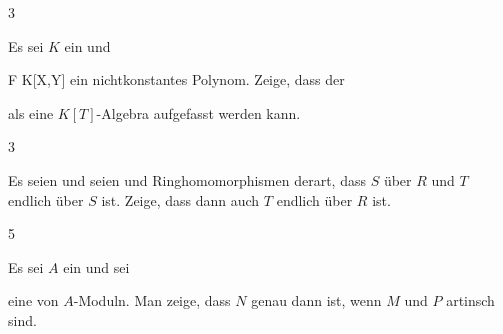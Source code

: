{3}
{





Es sei $K$ ein
und

\mavergleichskette
{\vergleichskette
{ F
}
{ \in }{ K[X,Y]
}
{  }{
}
{    }{
}
{   }{
}
}
{}{}{}
ein nichtkonstantes Polynom. Zeige, dass der

 {  }

als eine
$K[T]$-Algebra aufgefasst werden kann.





}
{} {}

{3}
{





Es seien
und seien
 und
 Ringhomomorphismen derart, dass $S$
über $R$ und $T$ endlich über $S$ ist. Zeige, dass dann auch $T$ endlich über $R$ ist.





}
{} {}

{5}
{





Es sei $A$ ein
und sei

 {  }

eine
von $A$-Moduln. Man zeige, dass $N$ genau dann
ist, wenn $M$ und $P$ artinsch sind.





}
{} {}

